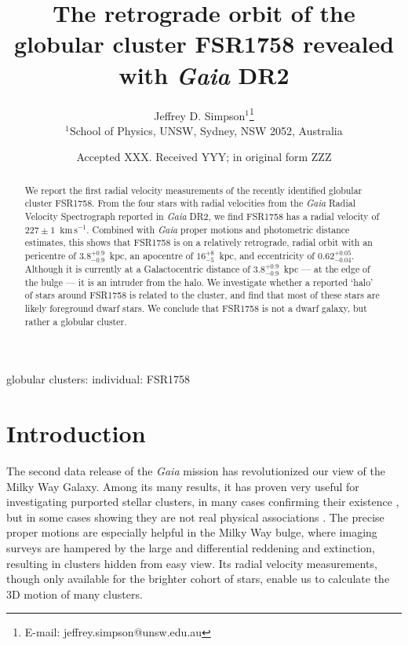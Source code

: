 \documentclass[fleqn,usenatbib]{mnras}
\title[The orbit of FSR1758]{The retrograde orbit of the globular cluster FSR1758 revealed with \textit{Gaia} DR2}
\author[Simpson]{
Jeffrey D. Simpson$^{1}$\thanks{E-mail: jeffrey.simpson@unsw.edu.au}
\\
$^{1}$School of Physics, UNSW, Sydney, NSW 2052, Australia
}
\date{Accepted XXX. Received YYY; in original form ZZZ}
\newcommand{\kms}{~\ensuremath{\textrm{km}\,\textrm{s}^{-1}}}
\begin{document}
\label{firstpage}
\pagerange{\pageref{firstpage}--\pageref{lastpage}}
\maketitle

\begin{abstract}
We report the first radial velocity measurements of the recently identified globular cluster FSR1758. From the four stars with radial velocities from the \textit{Gaia} Radial Velocity Spectrograph reported in \textit{Gaia} DR2, we find FSR1758 has a radial velocity of $227\pm1$\kms. Combined with \textit{Gaia} proper motions and photometric distance estimates, this shows that FSR1758 is on a relatively retrograde, radial orbit with an pericentre of $3.8_{-0.9}^{+0.9}$~kpc, an apocentre of $16_{-5}^{+8}$~kpc, and eccentricity of $0.62_{-0.04}^{+0.05}$. Although it is currently at a Galactocentric distance of $3.8_{-0.9}^{+0.9}$~kpc --- at the edge of the bulge --- it is an intruder from the halo. We investigate whether a reported `halo' of stars around FSR1758 is related to the cluster, and find that most of these stars are likely foreground dwarf stars. We conclude that FSR1758 is not a dwarf galaxy, but rather a globular cluster.
\end{abstract}

\begin{keywords}
globular clusters: individual: FSR1758
\end{keywords}



\section{Introduction} \label{sec:intro}
The second data release of the \textit{Gaia} mission \citep{GaiaCollaboration:2016cu,GaiaCollaboration:2018io} has revolutionized our view of the Milky Way Galaxy. Among its many results, it has proven very useful for investigating purported stellar clusters, in many cases confirming their existence \citep[e.g.,][]{Simpson:2017ex,Soubiran2018,Cantat-Gaudin2018}, but in some cases showing they are not real physical associations \citep[e.g.,][]{Kos:2018we}. The precise proper motions are especially helpful in the Milky Way bulge, where imaging surveys are hampered by the large and differential reddening and extinction, resulting in clusters hidden from easy view. Its radial velocity measurements, though only available for the brighter cohort of stars, enable us to calculate the 3D motion of many clusters.
\end{document}

